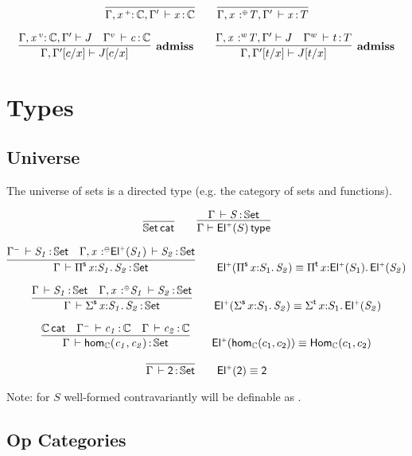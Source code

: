 \documentclass[11pt]{article}
\theoremstyle{plain}
\begin{document}
\[
\infer{\ofdtp{\Gamma,\vtptm{x}{\co}{\C},\Gamma'}{x}{\C}}{}
\qquad
\infer{\oftp{\Gamma,\tptmv{x}{\coc}{T},\Gamma'}{x}{T}}{}
\]


\[
\infer[\textbf{admiss}]
      {\Gamma,\subst{\Gamma'}{c}{x} \vdash \subst{J}{c}{x}}
      {\Gamma,\vtptm{x}{v}{\C},\Gamma' \vdash {J} &
        \oftp{\Gamma^v}{c}{\C}}
\qquad
\infer[\textbf{admiss}]
      {\Gamma,\subst{\Gamma'}{t}{x} \vdash \subst{J}{t}{x}}
      {\Gamma,\tptmv{x}{w}{T},\Gamma' \vdash {J} &
        \oftp{\Gamma^w}{t}{T}}
\]

\section{Types}

\subsection{Universe}

The universe of sets is a directed type (e.g. the category of sets and
functions).

\[
\infer{\wfdtp{\types}}{}
\qquad
\infer{\wftp{\Gamma}{\Elp{S}}}
      {\oftp{\Gamma}{S}{\types}}
\]

\[
\infer{\oftp{\Gamma}{\piset{x}{S_1}{S_2}}{\types}}
      {\oftp{\Gamma^\con}{S_1}{\types} &
        \oftp{\Gamma, \tptmv {x}{\conc}{\Elp{S_1}}}{S_2}{\types}}
\qquad
\Elp{\piset{x}{S_1}{S_2}} \deq \pitp{x}{\Elp{S_1}}{\Elp{S_2}}
\]

\[
\infer{\oftp{\Gamma}{\sigmaset{x}{S_1}{S_2}}{\types}}
      {\oftp{\Gamma}{S_1}{\types} &
        \oftp{\Gamma, \tptmv {x}{\coc}{S_1}}{S_2}{\types}}
\qquad
\Elp{\sigmaset{x}{S_1}{S_2}} \deq \sigmatp{x}{S_1}{\Elp{S_2}}
\]

\[
\infer{\oftp{\Gamma}{\homset{\C}{c_1}{c_2}}{\types}}
      {\wfdtp{\C} &
        \oftp{\Gamma^\con}{c_1}{\C} &
        \oftp{\Gamma}{c_2}{\C}}
\qquad
\Elp{\homset{\C}{c_1}{c_2}} \deq \homtp{\C}{c_1}{c_2}
\]

\[
\infer{\oftp{\Gamma}{\bool}{\types}}
      {}
\qquad
\Elp{\bool} \deq \bool
\]


Note:  for $S$ well-formed contravariantly will be definable as
.

\subsection{Op Categories}
\end{document}
